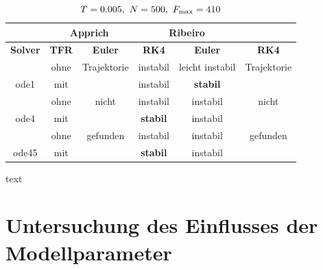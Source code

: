 \begin{table}[htbp]
	\centering
		\begin{tabular}{c|c|c|c|c|c}
			\rowcolor[gray]{0.9}
			\multicolumn{2}{c|}{\textbf{Simulation}} & \multicolumn{2}{c|}{\textbf{Apprich}} & \multicolumn{2}{c}{\textbf{Ribeiro}} \\
			\midrule
			\rowcolor[gray]{0.9}
			\textbf{Solver} & \textbf{TFR} & \textbf{Euler} & \textbf{RK4} & \textbf{Euler} & \textbf{RK4} \\
			\midrule
			\cellcolor[gray]{0.9}  											& \cellcolor[gray]{.9}ohne & Trajektorie  & instabil & leicht instabil & Trajektorie\\
			\multirow{-2}{*}{\cellcolor[gray]{.9}ode1}	& \cellcolor[gray]{.9}mit  &   						& instabil & \textbf{stabil} 				 & 	\\
			\midrule		
			\cellcolor[gray]{0.9}  											& \cellcolor[gray]{.9}ohne & nicht	& instabil 						& instabil & nicht\\
			\multirow{-2}{*}{\cellcolor[gray]{.9}ode4}	& \cellcolor[gray]{.9}mit  &        & \textbf{stabil}   	& instabil & \\
			\midrule	
			\cellcolor[gray]{0.9}  											& \cellcolor[gray]{.9}ohne & gefunden 	&  instabil    			& instabil 	& gefunden\\
			\multirow{-2}{*}{\cellcolor[gray]{.9}ode45}	& \cellcolor[gray]{.9}mit  &  					&  \textbf{stabil}  & instabil 	& \\																											
		\end{tabular}
	\caption{$T=0.005, \ N=500, \ F_{\mrm{max}}=410$}
	\label{tab:T001N350Fmax400}
\end{table}

text 


\section{Untersuchung des Einflusses der Modellparameter}\label{sec:trjparamtest}

